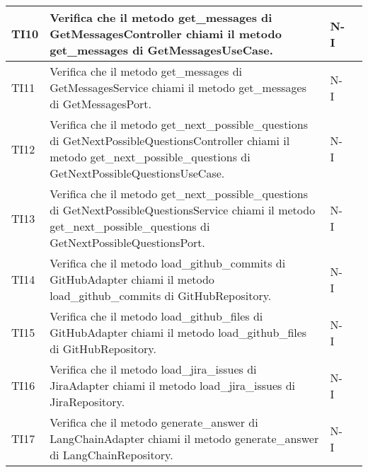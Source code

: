 \begin{table}[h!]
\begin{tabularx}{\textwidth}{|p{}|X|p{}|p{}|}
    TI10 & Verifica che il metodo get\_messages di GetMessagesController chiami il metodo get\_messages di GetMessagesUseCase. &  N-I \\ \hline
    TI11 & Verifica che il metodo get\_messages di GetMessagesService chiami il metodo get\_messages di GetMessagesPort. &  N-I \\ \hline
    TI12 & Verifica che il metodo get\_next\_possible\_questions di GetNextPossibleQuestionsController chiami il metodo get\_next\_possible\_questions di GetNextPossibleQuestionsUseCase. &  N-I \\ \hline
    TI13 & Verifica che il metodo get\_next\_possible\_questions di GetNextPossibleQuestionsService chiami il metodo get\_next\_possible\_questions di GetNextPossibleQuestionsPort. &  N-I \\ \hline
    TI14 & Verifica che il metodo load\_github\_commits di GitHubAdapter chiami il metodo load\_github\_commits di GitHubRepository. &  N-I \\ \hline
    TI15 & Verifica che il metodo load\_github\_files di GitHubAdapter chiami il metodo load\_github\_files di GitHubRepository. &  N-I \\ \hline
    TI16 & Verifica che il metodo load\_jira\_issues di JiraAdapter chiami il metodo load\_jira\_issues di JiraRepository. &  N-I \\ \hline
    TI17 & Verifica che il metodo generate\_answer di LangChainAdapter chiami il metodo generate\_answer di LangChainRepository. &  N-I \\ \hline
    \end{tabularx}
\end{table}

\newpage

